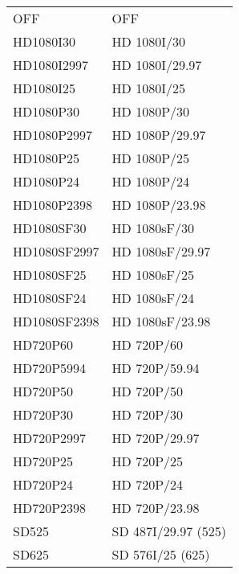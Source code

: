 \begin{tabular}{l l}
OFF           &  OFF              \\                              
HD1080I30     &  HD 1080I/30     \\                               
HD1080I2997   &  HD 1080I/29.97  \\                                                
HD1080I25     &  HD 1080I/25     \\                                                 
HD1080P30     &  HD 1080P/30     \\                                                 
HD1080P2997   &  HD 1080P/29.97  \\                                                
HD1080P25     &  HD 1080P/25     \\                                                 
HD1080P24     &  HD 1080P/24     \\                                                      
HD1080P2398   &  HD 1080P/23.98  \\                                                     
HD1080SF30    &  HD 1080sF/30    \\                                   
HD1080SF2997  &  HD 1080sF/29.97 \\                                  
HD1080SF25    &  HD 1080sF/25    \\                                   
HD1080SF24    &  HD 1080sF/24    \\                                   
HD1080SF2398  &  HD 1080sF/23.98 \\                                  
HD720P60      &  HD 720P/60       \\                                                     
HD720P5994    &  HD 720P/59.94    \\                                                    
HD720P50      &  HD 720P/50       \\                                                     
HD720P30      &  HD 720P/30       \\                                                     
HD720P2997    &  HD 720P/29.97    \\                                                    
HD720P25      &  HD 720P/25       \\                                                     
HD720P24      &  HD 720P/24       \\                                                     
HD720P2398    &  HD 720P/23.98    \\                                                    
SD525         &  SD 487I/29.97 (525)\\                            
SD625         &  SD 576I/25 (625)\\
\end{tabular}

